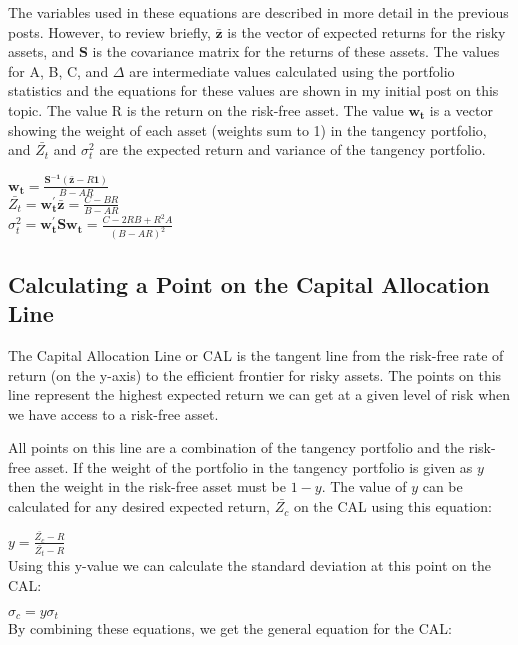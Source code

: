 \documentclass[12pt,a4paper]{article}
\begin{document}
The variables used in these equations are described in more detail in the previous posts.  However, to review briefly, $\mathbf{\bar{z}}$  is the vector of expected returns for the risky assets, and $\mathbf{S}$ is the covariance matrix for the returns of these assets.  The values for A, B, C, and $\Delta$ are intermediate values calculated using the portfolio statistics and the equations for these values are shown in my initial post on this topic. The value R is the return on the risk-free asset.  The value $\mathbf{w_{t}}$ is a vector showing the weight of each asset (weights sum to 1) in the tangency portfolio, and $\bar{Z_{t}}$ and $\sigma_{t}^{2}$ are the expected return and variance of the tangency portfolio.

$\mathbf{w_{t}}=\frac{\mathbf{S^{-1}}\left ( \mathbf{\bar{z}}-R \mathbf{1}\right )}{B-AR}$\\

$\bar{Z_{t}}=\mathbf{w_{t}^{'}\bar{z}}=\frac{C-BR}{B-AR}$\\

$\sigma _{t}^{2}=\mathbf{w_{t}^{'}Sw_{t}}=\frac{C-2RB+R^{2}A}{\left ( B-AR \right )^{2}}$\\

\subsection{Calculating a Point on the Capital Allocation Line}
The Capital Allocation Line or CAL is the tangent line from the risk-free rate of return (on the y-axis) to the efficient frontier for risky assets. The points on this line represent the highest expected return we can get at a given level of risk when we have access to a risk-free asset. 

All points on this line are a combination of the tangency portfolio and the risk-free asset.  If the weight of the portfolio in the tangency portfolio is given as $y$ then the weight in the risk-free asset must be $1-y$.  The value of $y$ can be calculated for any desired expected return, $\bar{Z_{c}}$ on the CAL using this equation:

$y=\frac{\bar{Z_c}-R}{\bar{Z_t}-R}$\\

Using this y-value we can calculate the standard deviation at this point on the CAL:

$\sigma_{c}= y\sigma_t$\\

By combining these equations, we get the general equation for the CAL:
\end{document}

